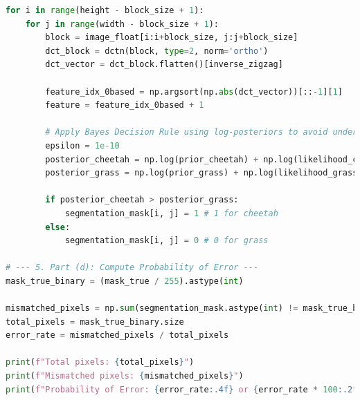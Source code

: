 \begin{lstlisting}[language=Python, caption={Python code for HW1}, label={code:hw1}]
for i in range(height - block_size + 1):
    for j in range(width - block_size + 1):
        block = image_float[i:i+block_size, j:j+block_size]
        dct_block = dctn(block, type=2, norm='ortho')
        dct_vector = dct_block.flatten()[inverse_zigzag]

        feature_idx_0based = np.argsort(np.abs(dct_vector))[::-1][1]
        feature = feature_idx_0based + 1

        # Apply Bayes Decision Rule using log-posteriors to avoid underflow
        epsilon = 1e-10
        posterior_cheetah = np.log(prior_cheetah) + np.log(likelihood_cheetah[feature - 1] + epsilon)
        posterior_grass = np.log(prior_grass) + np.log(likelihood_grass[feature - 1] + epsilon)

        if posterior_cheetah > posterior_grass:
            segmentation_mask[i, j] = 1 # 1 for cheetah
        else:
            segmentation_mask[i, j] = 0 # 0 for grass

# --- 5. Part (d): Compute Probability of Error ---
mask_true_binary = (mask_true / 255).astype(int)

mismatched_pixels = np.sum(segmentation_mask.astype(int) != mask_true_binary)
total_pixels = mask_true_binary.size
error_rate = mismatched_pixels / total_pixels

print(f"Total pixels: {total_pixels}")
print(f"Mismatched pixels: {mismatched_pixels}")
print(f"Probability of Error: {error_rate:.4f} or {error_rate * 100:.2f}%")
\end{lstlisting}